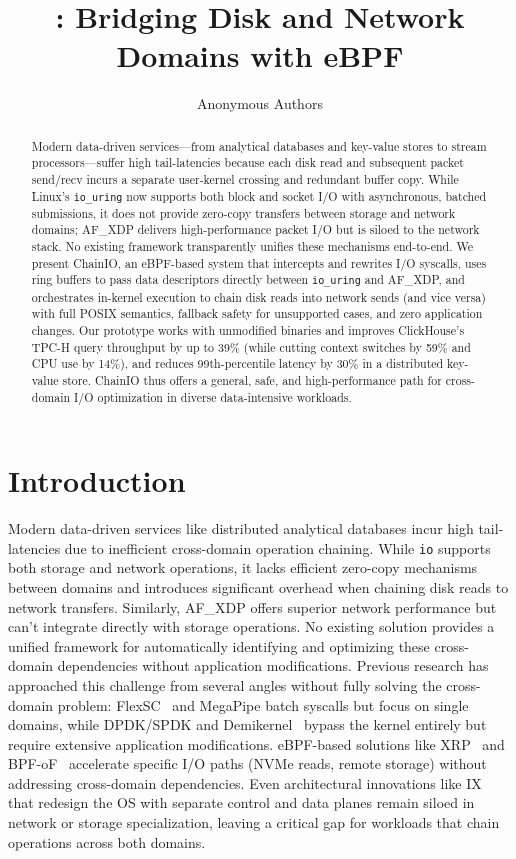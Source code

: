 \documentclass[sigconf,10pt]{acmart}
\title{\sys: Bridging Disk and Network Domains with eBPF}
\author{
Anonymous Authors
}
\newcommand{\sys}{ChainIO\xspace}
\begin{document}
\begin{abstract}
Modern data-driven services—from analytical databases and key-value stores to stream processors—suffer high tail-latencies because each disk read and subsequent packet send/recv incurs a separate user-kernel crossing and redundant buffer copy. While Linux’s \texttt{io\_uring} now supports both block and socket I/O with asynchronous, batched submissions, it does not provide zero-copy transfers between storage and network domains; AF\_XDP delivers high-performance packet I/O but is siloed to the network stack. No existing framework transparently unifies these mechanisms end-to-end. We present \sys, an eBPF-based system that intercepts and rewrites I/O syscalls, uses ring buffers to pass data descriptors directly between \texttt{io\_uring} and AF\_XDP, and orchestrates in-kernel execution to chain disk reads into network sends (and vice versa) with full POSIX semantics, fallback safety for unsupported cases, and zero application changes. Our prototype works with unmodified binaries and improves ClickHouse’s TPC-H query throughput by up to 39\% (while cutting context switches by 59\% and CPU use by 14\%), and reduces 99th-percentile latency by 30\% in a distributed key-value store. \sys thus offers a general, safe, and high-performance path for cross-domain I/O optimization in diverse data-intensive workloads.
\end{abstract}

\maketitle

\section{Introduction}

Modern data-driven services like distributed analytical databases incur high tail-latencies due to inefficient cross-domain operation chaining. While \texttt{io\uring} supports both storage and network operations, it lacks efficient zero-copy mechanisms between domains and introduces significant overhead when chaining disk reads to network transfers. Similarly, AF\_XDP offers superior network performance but can't integrate directly with storage operations. No existing solution provides a unified framework for automatically identifying and optimizing these cross-domain dependencies without application modifications. Previous research has approached this challenge from several angles without fully solving the cross-domain problem: FlexSC~\cite{flexsc} and MegaPipe batch syscalls but focus on single domains, while DPDK/SPDK and Demikernel~\cite{zhang2021demikernel} bypass the kernel entirely but require extensive application modifications. eBPF-based solutions like XRP~\cite{Zhong22} and BPF-oF~\cite{zarkadas2023bpf} accelerate specific I/O paths (NVMe reads, remote storage) without addressing cross-domain dependencies. Even architectural innovations like IX~\cite{ix} that redesign the OS with separate control and data planes remain siloed in network or storage specialization, leaving a critical gap for workloads that chain operations across both domains.
\end{document}
